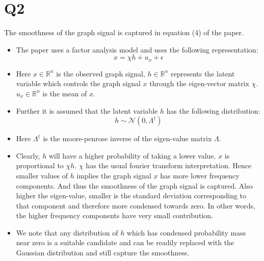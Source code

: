 \documentclass{article}
\begin{document}
\section*{Q2}
The smoothness of the graph signal is captured in equation (4) of the paper.
\begin{itemize}
\item The paper uses a factor analysis model and uses the following representation:
  $$ x = \chi h + u_x + \epsilon$$
\item Here $x \in \mathbb{R}^n$ is the observed graph signal, $h \in \mathbb{R}^n$ represents the latent variable which controls the graph signal $x$ through the eigen-vector matrix $\chi$. $u_x \in \mathbb{R}^n$ is the mean of $x$.
\item Further it is assumed that the latent variable $h$ has the following distribution:
  $$h \sim \mathcal{N}(0, \Lambda^{\dagger})$$
\item Here $\Lambda^{\dagger}$ is the moore-penrose inverse of the eigen-value matrix $\Lambda$.
\item Clearly, $h$ will have a higher probability of taking a lower value. $x$ is proportional to $\chi h$. $\chi$ has the usual fourier transform interpretation. Hence smaller values of $h$ implies the graph signal $x$ has more lower frequency components. And thus the smoothness of the graph signal is captured. Also higher the eigen-value, smaller is the standard deviation corresponding to that component and therefore more condensed towards zero. In other words, the higher frequency components have very small contribution.
\item We note that any distribution of $h$ which has condensed probability mass near zero is a suitable candidate and can be readily replaced with the Gaussian distribution and still capture the smoothness.
\end{itemize}
\end{document}
